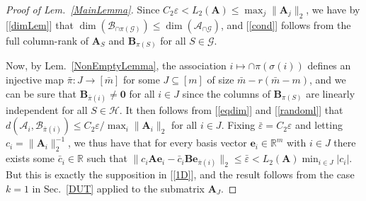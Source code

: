 \documentclass[9pt,twocolumn]{pnas-new}
\newtheorem{problem}{Problem}
\renewcommand{\eqref}[1]{\textnormal{[\ref{#1}]}}
\begin{document}
\begin{proof}[Proof of Lem.~\ref{MainLemma}]
Since $C_2 \varepsilon < L_2(\mathbf{A}) \leq \max_j\|\mathbf{A}_j\|_2$, we have by \eqref{dimLem} that $\dim(\bm{\mathcal{B}}_{\cap \pi(\mathcal{G})}) \leq \dim(\bm{\mathcal{A}}_{\cap \mathcal{G}})$, and \eqref{cond} follows from the full column-rank of $\mathbf{A}_{S}$ and $\mathbf{B}_{\pi(S)}$ for all $S \in \mathcal{G}$.

Now, by Lem.~\ref{NonEmptyLemma}, the association $i \mapsto \cap \pi(\sigma(i))$ defines an injective map $\bar \pi: J \to [\bar m]$ for some $J \subseteq [m]$ of size $\bar m - r(\bar m - m)$, and we can be sure that $\mathbf{B}_{\bar \pi(i)} \neq \mathbf{0}$ for all $i \in J$ since the columns of $\mathbf{B}_{\pi(S)}$ are linearly independent for all $S \in \mathcal{H}$. It then follows from \eqref{eqdim} and \eqref{randoml} that $d\left( \bm{\mathcal{A}}_i, \bm{\mathcal{B}}_{\bar \pi(i)} \right) \leq C_2 \varepsilon / \max_i \|\mathbf{A}_i\|_2$ for all $i \in J$. Fixing $\bar \varepsilon = C_2\varepsilon$ and letting $c_i = \|\mathbf{A}_i\|_2^{-1}$, we thus have that for every basis vector $\mathbf{e}_i \in \mathbb{R}^m$ with $i \in J$ there exists some $\bar{c}_i \in \mathbb{R}$ such that $\|c_i\mathbf{A}\mathbf{e}_i - \bar{c}_i \mathbf{B}\mathbf{e}_{\bar \pi(i)}\|_2 \leq \bar \varepsilon < L_2(\mathbf{A}) \min_{i\in J} |c_i|$.  But this is exactly the supposition in \eqref{1D}, and the result follows from the case $k=1$ in Sec.~\ref{DUT} applied to the submatrix $\mathbf{A}_J$.
\end{proof}



%
\end{document}
